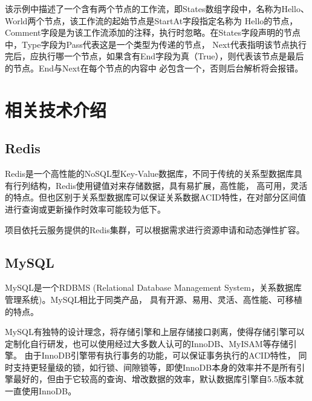 该示例中描述了一个含有两个节点的工作流，即States数组字段中，名称为Hello、World两个节点，该工作流的起始节点是StartAt字段指定名称为
Hello的节点，Comment字段是为该工作流添加的注释，执行时忽略。在States字段声明的节点中，Type字段为Pass代表这是一个类型为传递的节点，
Next代表指明该节点执行完后，应执行哪一个节点，如果含有End字段为真（True），则代表该节点是最后的节点。End与Next在每个节点的内容中
必包含一个，否则后台解析将会报错。
%



\section{相关技术介绍}

\subsection{Redis}
Redis是一个高性能的NoSQL型Key-Value数据库，不同于传统的关系型数据库具有行列结构，Redis使用键值对来存储数据，具有易扩展，高性能，
高可用，灵活的特点。但也区别于关系型数据库可以保证关系数据ACID特性，在对部分区间值进行查询或更新操作时效率可能较为低下。

项目依托云服务提供的Redis集群，可以根据需求进行资源申请和动态弹性扩容。

\subsection{MySQL}
MySQL是一个RDBMS (Relational Database Management System，关系数据库管理系统)。MySQL相比于同类产品，
具有开源、易用、灵活、高性能、可移植的特点。

MySQL有独特的设计理念，将存储引擎和上层存储接口剥离，使得存储引擎可以定制化自行研发，也可以使用经过大多数人认可的InnoDB、MyISAM等存储引擎。
由于InnoDB引擎带有执行事务的功能，可以保证事务执行的ACID特性，
同时支持更轻量级的锁，如行锁、间隙锁等，即使InnoDB本身的效率并不是所有引擎最好的，但由于它较高的查询、增改数据的效率，默认数据库引擎自5.5版本就
一直使用InnoDB。


